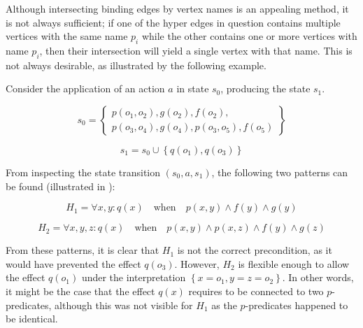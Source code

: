 \documentclass[../Master.tex]{subfiles}
\begin{document}
Although intersecting binding edges by vertex names is an appealing method, it is not always sufficient; if one of the hyper edges in question contains multiple vertices with the same name $p_i$ while the other contains one or more vertices with name $p_i$, then their intersection will yield a single vertex with that name. This is not always desirable, as illustrated by the following example.

\begin{example} \label{ex:ca:hgma:generalization}
	Consider the application of an action $a$ in state $s_0$, producing the state $s_1$.

	\begin{equation*}
		s_0 = \left\{
			\begin{gathered}
				p(o_1, o_2), g(o_2), f(o_2), \\
				p(o_3, o_4), g(o_4), p(o_3, o_5), f(o_5)
			\end{gathered}
		\right\}
	\end{equation*}

	\begin{equation*}
		s_1 = s_0 \cup \left\{ q\left( o_1 \right), q \left( o_3 \right) \right\}
	\end{equation*}

	From inspecting the state transition $\left( s_0, a, s_1 \right)$, the following two patterns can be found (illustrated in ):

    \begin{equation*}
        H_1 = \forall x, y : q(x) \quad \text{when} \quad
            p(x,y) \land f(y) \land g(y)
    \end{equation*}

    \begin{equation*}
        H_2 = \forall x, y, z : q(x) \quad \text{when} \quad
            p(x, y) \land p(x,z) \land f(y) \land g(z)
    \end{equation*}

	From these patterns, it is clear that $H_1$ is not the correct precondition, as it would have prevented the effect $q\left(o_3\right)$. However, $H_2$ is flexible enough to allow the effect $q\left(o_1\right)$ under the interpretation $\left\{ x = o_1, y = z = o_2 \right\}$. In other words, it might be the case that the effect $q(x)$ requires to be connected to two $p$-predicates, although this was not visible for $H_1$ as the $p$-predicates happened to be identical.


\end{example}
\end{document}
